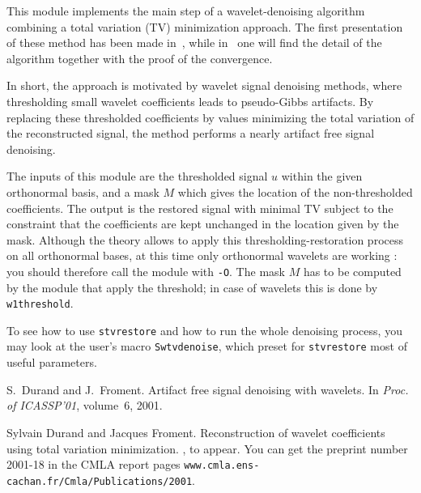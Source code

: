 This module implements the main step of a wavelet-denoising algorithm combining a total 
variation (TV) minimization approach. The first presentation of these method has been
made in~\cite{DF:ArtifactFree}, while in~\cite{DF:ReconsWaveletUsingTV} one
will find the detail of the algorithm together with the proof of the convergence.

In short, the approach is motivated by wavelet signal denoising methods, where 
thresholding small wavelet coefficients leads to pseudo-Gibbs artifacts. By replacing
these thresholded coefficients by values minimizing the total variation of the
reconstructed signal, the method performs a nearly artifact free signal denoising.

The inputs of this module are the thresholded signal $u$ within the given orthonormal
basis, and a mask $M$ which gives the location of the non-thresholded coefficients.
The output is the restored signal with minimal TV subject to the constraint that
the coefficients are kept unchanged in the location given by the mask.
Although the theory allows to apply this thresholding-restoration process on all
orthonormal bases, at this time only orthonormal wavelets are working : you should
therefore call the module with {\tt -O}.
The mask $M$ has to be computed by the module that apply the threshold; in case of
wavelets this is done by {\tt w1threshold}.

To see how to use {\tt stvrestore} and how to run the whole denoising process, 
you may look at the user's macro {\tt Swtvdenoise}, which preset for
{\tt stvrestore} most of useful parameters.

\begin{thebibliography}{Dau1}

S.~Durand and J.~Froment.
\newblock Artifact free signal denoising with wavelets.
\newblock In {\em Proc. of ICASSP'01}, volume~6, 2001.

Sylvain Durand and Jacques Froment.
\newblock Reconstruction of wavelet coefficients using total variation minimization.
, to appear. You can get the preprint number 2001-18
in the CMLA report pages {\tt www.cmla.ens-cachan.fr/Cmla/Publications/2001}.


\end{thebibliography}
